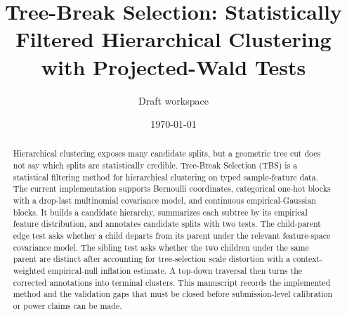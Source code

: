 \documentclass[11pt]{article}
\title{Tree-Break Selection: Statistically Filtered Hierarchical Clustering with Projected-Wald Tests}
\author{Draft workspace}
\date{\today}
\begin{document}
\maketitle

\begin{abstract}
Hierarchical clustering exposes many candidate splits, but a geometric tree
cut does not say which splits are statistically credible. Tree-Break Selection
(TBS) is a
statistical filtering method for hierarchical clustering on typed
sample-feature data. The current implementation supports Bernoulli coordinates,
categorical one-hot blocks with a drop-last multinomial covariance model, and
continuous empirical-Gaussian blocks. It builds a candidate hierarchy,
summarizes each subtree by its empirical feature distribution, and annotates
candidate splits with two tests. The child-parent edge test asks whether a child
departs from its parent under the relevant feature-space covariance model. The
sibling test asks whether the two children under the same parent are distinct
after accounting for tree-selection scale distortion with a context-weighted
empirical-null inflation estimate. A top-down traversal then turns the
corrected annotations into terminal clusters. This manuscript records the
implemented method and the validation gaps that must be closed before
submission-level calibration or power claims can be made.
\end{abstract}







\appendix




\end{document}
